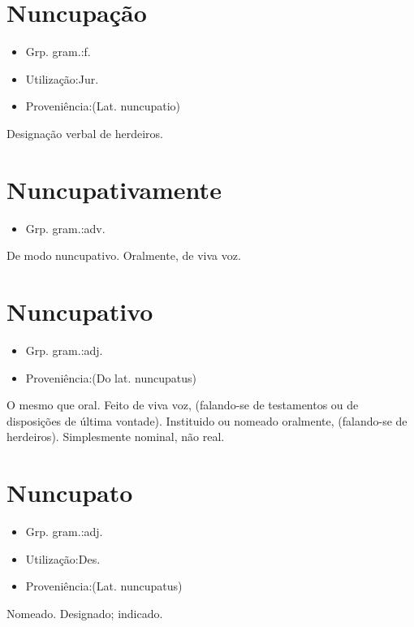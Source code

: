 \section{Nuncupação}
\begin{itemize}
\item {Grp. gram.:f.}
\end{itemize}
\begin{itemize}
\item {Utilização:Jur.}
\end{itemize}
\begin{itemize}
\item {Proveniência:(Lat. \textunderscore nuncupatio\textunderscore )}
\end{itemize}
Designação verbal de herdeiros.
\section{Nuncupativamente}
\begin{itemize}
\item {Grp. gram.:adv.}
\end{itemize}
De modo nuncupativo.
Oralmente, de viva voz.
\section{Nuncupativo}
\begin{itemize}
\item {Grp. gram.:adj.}
\end{itemize}
\begin{itemize}
\item {Proveniência:(Do lat. \textunderscore nuncupatus\textunderscore )}
\end{itemize}
O mesmo que \textunderscore oral\textunderscore .
Feito de viva voz, (falando-se de testamentos ou de disposições de última vontade).
Instituido ou nomeado oralmente, (falando-se de herdeiros).
Simplesmente nominal, não real.
\section{Nuncupato}
\begin{itemize}
\item {Grp. gram.:adj.}
\end{itemize}
\begin{itemize}
\item {Utilização:Des.}
\end{itemize}
\begin{itemize}
\item {Proveniência:(Lat. \textunderscore nuncupatus\textunderscore )}
\end{itemize}
Nomeado.
Designado; indicado.
